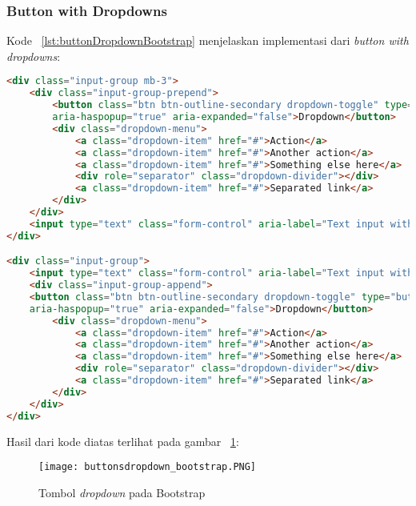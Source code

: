 \subsubsection{Button with Dropdowns}
\noindent Kode ~\ref{lst:buttonDropdownBootstrap} menjelaskan implementasi dari \textit{button with dropdowns}:
\begin{lstlisting}[style=customhtml, language=HTML,  basicstyle=\ttfamily, frame=single, columns=fullflexible, keepspaces=true, breaklines=true, showstringspaces=false, label={lst:buttonDropdownBootstrap}, caption=Button dropdown pada bootstrap 4.] 
<div class="input-group mb-3">
	<div class="input-group-prepend">
		<button class="btn btn-outline-secondary dropdown-toggle" type="button" data-toggle="dropdown"
		aria-haspopup="true" aria-expanded="false">Dropdown</button>
		<div class="dropdown-menu">
			<a class="dropdown-item" href="#">Action</a>
			<a class="dropdown-item" href="#">Another action</a>
			<a class="dropdown-item" href="#">Something else here</a>
			<div role="separator" class="dropdown-divider"></div>
			<a class="dropdown-item" href="#">Separated link</a>
		</div>
	</div>
	<input type="text" class="form-control" aria-label="Text input with dropdown button">
</div>

<div class="input-group">
	<input type="text" class="form-control" aria-label="Text input with dropdown button">
	<div class="input-group-append">
	<button class="btn btn-outline-secondary dropdown-toggle" type="button" data-toggle="dropdown"
	aria-haspopup="true" aria-expanded="false">Dropdown</button>
		<div class="dropdown-menu">
			<a class="dropdown-item" href="#">Action</a>
			<a class="dropdown-item" href="#">Another action</a>
			<a class="dropdown-item" href="#">Something else here</a>
			<div role="separator" class="dropdown-divider"></div>
			<a class="dropdown-item" href="#">Separated link</a>
		</div>
	</div>
</div>
\end{lstlisting}

\noindent Hasil dari kode diatas terlihat pada gambar ~\ref{fig:dropdownBootstrap}:
\begin{figure} [H]
	\centering  
	\texttt{[image: buttonsdropdown\_bootstrap.PNG]}  
	\caption{Tombol \textit{dropdown} pada Bootstrap} 
	\label{fig:dropdownBootstrap}
\end{figure}

